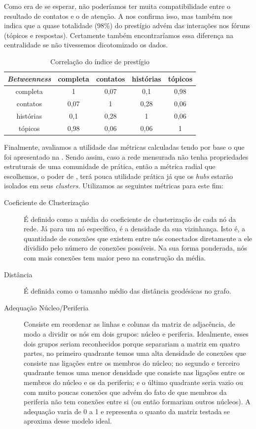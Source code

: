 Como era de se esperar, não poderíamos ter muita compatibilidade entre o
resultado de contatos e o de atenção. A  nos confirma
isso, mas também nos indica que a quase totalidade (98\%) do prestígio advém
das interações nos fóruns (tópicos e respostas). Certamente também
encontraríamos essa diferença na centralidade se não tivessemos dicotomizado os
dados.

\begin{table}[htbp]
	\setlength{\arrayrulewidth}{2\arrayrulewidth}  %
	\setlength{\belowcaptionskip}{10pt}  %
	\caption{Correlação do índice de prestígio} \centering   
	\begin{tabular}{| c | c c c c|}
	\hline
	\emph{Betweenness} & completa & contatos & histórias & tópicos \\ \hline
	completa & 1 & 0,07 & 0,1 & 0,98 \\
	contatos & 0,07 & 1 & 0,28 & 0,06 \\
	histórias & 0,1 & 0,28 & 1 & 0,06 \\
	tópicos & 0,98 & 0,06 & 0,06 & 1 \\\hline
	\end{tabular}
	\label{ap:tab:prest-corr}
\end{table}

Finalmente, avaliamos a utilidade das métricas calculadas tendo por base o que
foi apresentado na . Sendo assim, caso a rede mensurada
não tenha propriedades estruturais de uma comunidade de prática, então a métrica
radial que escolhemos, o poder de \citeauthor{Bonacich1987}, terá pouca
utilidade prática já que os \emph{hubs} estarão isolados em seus
\emph{clusters}. Utilizamos as seguintes métricas para este fim:
\begin{description}
\item[Coeficiente de Clusterização] É definido como a média do coeficiente de
clusterização de cada nó da rede. Já para um nó específico, é a densidade da
sua vizinhança. Isto é, a quantidade de conexões que existem entre nós
conectados diretamente a ele dividido pelo número de conexões possíveis. Na sua
forma ponderada, nós com mais conexões tem maior peso na construção da média.
\item[Distância] É definida como o tamanho médio das distância geodésicas no
grafo.
\item[Adequação Núcleo/Periferia] Consiste em reordenar as linhas e colunas da
matriz de adjacência, de modo a dividir os nós em dois grupos: núcleo e
periferia. Idealmente, esses dois grupos seriam reconhecidos porque separariam a
matriz em quatro partes, no primeiro quadrante temos uma alta densidade de
conexões que consiste nas ligações entre os membros do núcleo; no segundo
e terceiro quadrante temos uma menor densidade que consiste nas ligações entre
os membros do núcleo e os da periferia; e o último quadrante seria vazio ou com
muito poucas conexões que advém do fato de que membros da periferia não tem
conexões entre si (ou então formariam outros núcleos). A adequação varia de 0 a
1 e representa o quanto da matriz testada se aproxima desse modelo ideal.
\end{description}

